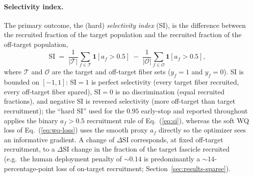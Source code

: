 \paragraph{Selectivity index.}
The primary outcome, the (hard) \emph{selectivity index} (SI), is the
difference between the recruited fraction of the target population and
the recruited fraction of the off-target population,
\begin{equation}
  \mathrm{SI} \;=\;
  \frac{1}{|\mathcal{T}|}\sum_{f\in\mathcal{T}}\mathbf{1}[a_f>0.5]
  \;-\;
  \frac{1}{|\mathcal{O}|}\sum_{f\in\mathcal{O}}\mathbf{1}[a_f>0.5],
  \label{eq:si}
\end{equation}
where $\mathcal{T}$ and $\mathcal{O}$ are the target and off-target
fiber sets ($y_f=1$ and $y_f=0$).  SI is bounded on $[-1,1]$:
$\mathrm{SI}=1$ is perfect selectivity (every target fiber recruited,
every off-target fiber spared), $\mathrm{SI}=0$ is no discrimination
(equal recruited fractions), and negative SI is reversed selectivity
(more off-target than target recruitment); the ``hard SI'' used for the
$0.95$ early-stop and reported throughout applies the binary
$a_f>0.5$ recruitment rule of Eq.~(\ref{eq:si}), whereas the soft WQ
loss of Eq.~(\ref{eq:wq-loss}) uses the smooth proxy $a_f$ directly so
the optimizer sees an informative gradient.  A change of $\Delta\mathrm{SI}$
corresponds, at fixed off-target recruitment, to a $\Delta\mathrm{SI}$
change in the fraction of the target fascicle recruited (e.g.\ the
human deployment penalty of ${\sim}0.14$ is predominantly a
${\sim}14$-percentage-point loss of on-target recruitment;
Section~\ref{sec:results-sparse}).

